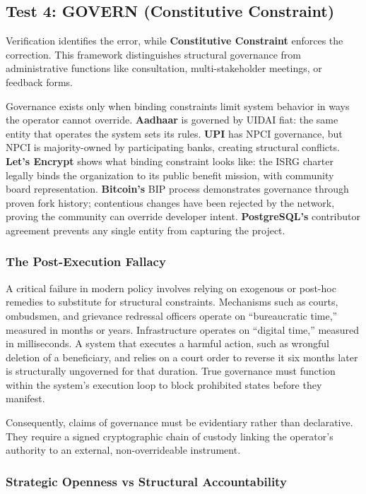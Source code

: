 \documentclass{article}
\begin{document}
\subsection{Test 4: GOVERN (Constitutive Constraint)}

Verification identifies the error, while \textbf{Constitutive Constraint} enforces the correction. This framework distinguishes structural governance from administrative functions like consultation, multi-stakeholder meetings, or feedback forms.

Governance exists only when binding constraints limit system behavior in ways the operator cannot override. \textbf{Aadhaar} is governed by UIDAI fiat: the same entity that operates the system sets its rules. \textbf{UPI} has NPCI governance, but NPCI is majority-owned by participating banks, creating structural conflicts. \textbf{Let's Encrypt} shows what binding constraint looks like: the ISRG charter legally binds the organization to its public benefit mission, with community board representation. \textbf{Bitcoin's} BIP process demonstrates governance through proven fork history; contentious changes have been rejected by the network, proving the community can override developer intent. \textbf{PostgreSQL's} contributor agreement prevents any single entity from capturing the project.

\subsubsection{The Post-Execution Fallacy}
A critical failure in modern policy involves relying on exogenous or post-hoc remedies to substitute for structural constraints. Mechanisms such as courts, ombudsmen, and grievance redressal officers operate on ``bureaucratic time,'' measured in months or years. Infrastructure operates on ``digital time,'' measured in milliseconds. A system that executes a harmful action, such as wrongful deletion of a beneficiary, and relies on a court order to reverse it six months later is structurally ungoverned for that duration. True governance must function within the system's execution loop to block prohibited states before they manifest.

Consequently, claims of governance must be evidentiary rather than declarative. They require a signed cryptographic chain of custody linking the operator's authority to an external, non-overrideable instrument.

\subsubsection{Strategic Openness vs Structural Accountability}
\end{document}
